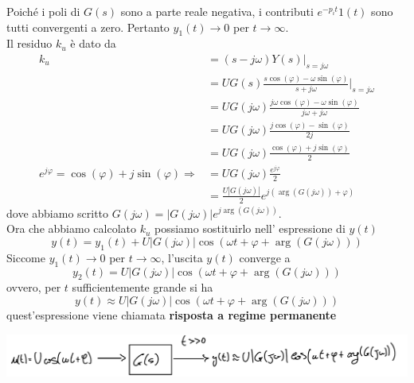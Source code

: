 \documentclass{article}
\numberwithin{equation}{subsection}
\begin{document}
Poiché i poli di $G(s)$ sono a parte reale negativa, i contributi $e^{-p_i t}1(t)$ sono tutti convergenti a zero. Pertanto $y_1(t) \rightarrow 0$ per $t \rightarrow \infty$.
\vspace*{0.1cm}\\
Il residuo $k_u$ è dato da
\begin{align*}
    k_u &= (s - j \omega) Y(s) \bigg|_{s = j\omega}
    \\
    &= U G(s) \frac{s \cos(\varphi) - \omega \sin(\varphi)}{s+j \omega}\bigg|_{s = j\omega}
    \\
    &= U G(j\omega) \frac{j\omega \cos(\varphi) - \omega \sin(\varphi)}{j\omega+j \omega}
    \\
    &=U G(j\omega) \frac{j \cos(\varphi) - \sin(\varphi)}{2j} 
    \\
    &= U G(j \omega) \frac{\cos(\varphi) + j\sin(\varphi)}{2}
    \\
    e^{j\varphi} = \cos(\varphi)+j \sin(\varphi) \Longrightarrow &= U G(j \omega) \frac{e^{j \varphi}}{2}
    \\
    &= \frac{U|G(j \omega)|}{2} e^{j (\arg(G(j\omega)) + \varphi)}
\end{align*}
dove abbiamo scritto $G(j \omega) = |G(j \omega)| e^{j \arg(G(j\omega))}$.
\vspace*{0.1cm}\\
Ora che abbiamo calcolato $k_u$ possiamo sostituirlo nell' espressione di $y(t)$
\begin{equation}
    y(t) = y_1(t) + U |G(j \omega)| \cos(\omega t + \varphi + \arg(G(j\omega)))
\end{equation}
Siccome $y_1(t) \rightarrow 0$ per $t \rightarrow \infty$, l'uscita $y(t)$ converge a 
\begin{equation}
    y_2(t) = U |G(j \omega)| \cos\left(\omega t + \varphi + \arg(G(j\omega))\right)
\end{equation}
ovvero, per $t$ sufficientemente grande si ha
\begin{equation}
    y(t) \approx U |G(j\omega)| \cos(\omega t + \varphi + \arg(G(j \omega)))
\end{equation}
quest'espressione viene chiamata \textbf{risposta a regime  permanente}
\begin{center}
    \includegraphics[scale=0.2]{Images/Risposta_regime_perm.png}
\end{center}
\end{document}
